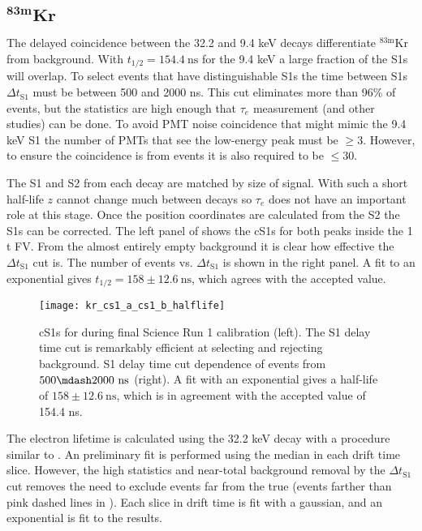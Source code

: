 \subsection{$\mathbf{^{83m}Kr}$}
\label{subsec:electron_lifetimes_measurement_kr}
The delayed coincidence between the 32.2 and 9.4 keV decays differentiate $\mathrm{^{83m}Kr}$ from background.  With
$t_{1/2} = 154.4\ \mathrm{ns}$ for the 9.4 keV a large fraction of the S1s will overlap.  To select events that have distinguishable S1s
the time between S1s $\Delta t_{\mathrm{S1}}$ must be between 500 and 2000 ns.  This cut eliminates more than 96\% of \metakr events, but
the statistics are high enough that $\tau_e$ measurement (and other studies) can be done.  To avoid PMT noise coincidence that might mimic
the 9.4 keV S1
the number of PMTs that see the low-energy peak must be $\geq 3$.  However, to ensure the coincidence is from \metakr events it is also
required to be $\leq 30$.

The S1 and S2 from each decay are matched by size of signal.  With such a short half-life $z$ cannot change much between decays so
$\tau_e$ does not have an important role at this stage.  Once the position coordinates are calculated from the S2 the S1s can be
corrected.  The left panel of  shows the cS1s for both peaks inside the
1 t FV.  From the
almost entirely empty background it is clear how effective the $\Delta t_{\mathrm{S1}}$ cut is.  The number of events vs.
$\Delta t_{\mathrm{S1}}$ is shown in the right panel.  A fit to an exponential gives $t_{1/2} = 158 \pm 12.6\ \mathrm{ns}$, which
agrees with the accepted value.

\begin{figure}
\centering
\texttt{[image: kr\_cs1\_a\_cs1\_b\_halflife]}
\caption{cS1s for \metakr during final Science Run 1 calibration (left).  The S1 delay time cut is remarkably efficient at selecting
\metakr and rejecting background.  S1 delay time cut dependence of events from $500 \mdash 2000\ \mathrm{ns}$ (right).  A fit with
an exponential gives a half-life of $158 \pm 12.6\ \mathrm{ns}$, which is in agreement with the accepted value of 154.4 ns.}
\label{fig:electron_lifetimes_measurement_kr_cs1_halflife}
\end{figure}

The electron lifetime is calculated using the 32.2 keV decay with a procedure similar to \alphadecays
{}.  An preliminary fit is performed using the median \stwob in each drift time
slice.  However, the high statistics and near-total background removal by the $\Delta t_{\mathrm{S1}}$ cut
removes the need to exclude events far from the true \metakr (events farther than pink dashed lines in
).  Each slice in drift time is fit with a gaussian, and an exponential
is fit to the results.

